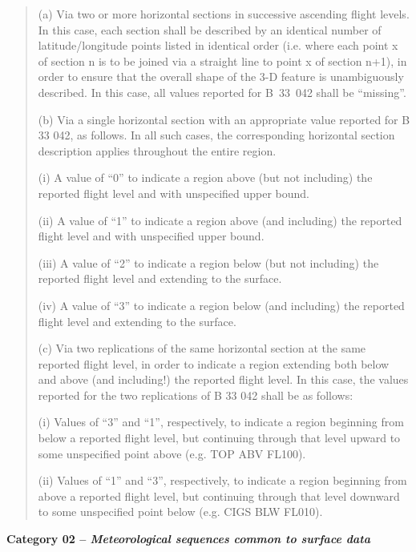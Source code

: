\begin{quote}
(a) Via two or more horizontal sections in successive ascending flight levels. In this case, each section shall be described by an identical number of latitude/longitude points listed in identical order (i.e. where each point x of section n is to be joined via a straight line to point x of section n+1), in order to ensure that the overall shape of the 3-D feature is unambiguously described. In this case, all values reported for B~33~042 shall be ``missing''.

(b) Via a single horizontal section with an appropriate value reported for B 33 042, as follows. In all such cases, the corresponding horizontal section description applies throughout the entire region.

(i) A value of ``0'' to indicate a region above (but not including) the reported flight level and with unspecified upper bound.

(ii) A value of ``1'' to indicate a region above (and including) the reported flight level and with unspecified upper bound.

(iii) A value of ``2'' to indicate a region below (but not including) the reported flight level and extending to the surface.

(iv) A value of ``3'' to indicate a region below (and including) the reported flight level and extending to the surface.

(c) Via two replications of the same horizontal section at the same reported flight level, in order to indicate a region extending both below and above (and including!) the reported flight level. In this case, the values reported for the two replications of B 33 042 shall be as follows:

(i) Values of ``3'' and ``1'', respectively, to indicate a region beginning from below a reported flight level, but continuing through that level upward to some unspecified point above (e.g. TOP ABV FL100).

(ii) Values of ``1'' and ``3'', respectively, to indicate a region beginning from above a reported flight level, but continuing through that level downward to some unspecified point below (e.g. CIGS BLW FL010).
\end{quote}

\textbf{Category 02 -- \emph{Meteorological sequences common to surface data}}

